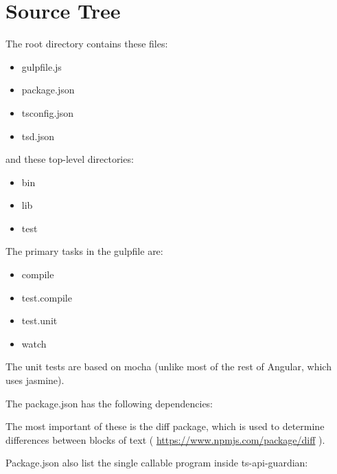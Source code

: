 \section{Source Tree}

The root directory contains these files:

\begin{itemize}
  \item gulpfile.js
  \item package.json
  \item tsconfig.json
  \item tsd.json
\end{itemize}

and these top-level directories:

\begin{itemize}
  \item bin
  \item lib
  \item test
\end{itemize}

The primary tasks in the gulpfile are:

\begin{itemize}
  \item compile
  \item test.compile
  \item test.unit
  \item watch
\end{itemize}

The unit tests are based on mocha (unlike most of the rest of Angular, which uses
jasmine).

The package.json has the following dependencies:



The most important of these is the diff package, which is used to determine
differences between blocks of text (
\url{https://www.npmjs.com/package/diff}
).

Package.json also list the single callable program inside ts-api-guardian:


